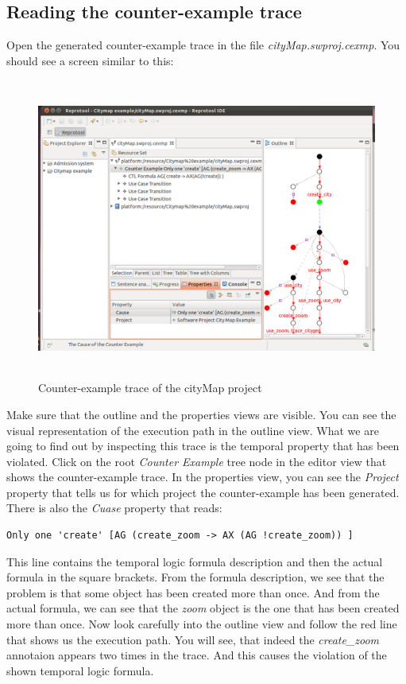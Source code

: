 \subsection{Reading the counter-example trace}
Open the generated counter-example trace in the file \emph{cityMap.swproj.cexmp}. You should see a screen similar to this:

\newpage

\begin{figure}[ht]
  \centering
  \includegraphics[height=280pt]{images/reprotoolTraceCityMap}
  \caption{Counter-example trace of the cityMap project}
  \label{fig:reprotoolTraceCityMap}
\end{figure}

Make sure that the outline and the properties views are visible. You can see the visual representation of the execution path in the
outline view. What we are going to find out by inspecting this trace is the temporal property that has been violated.
Click on the root \emph{Counter Example} tree node in the editor view that shows the counter-example trace. In the properties view,
you can see the \emph{Project} property that tells us for which project the counter-example has been generated. There is also the
\emph{Cuase} property that reads:
\begin{verbatim}
Only one 'create' [AG (create_zoom -> AX (AG !create_zoom)) ]
\end{verbatim}
This line contains the temporal logic formula description and then the actual formula in the square brackets. From the formula
description, we see that the problem is that some object has been created more than once. And from the actual formula, we can
see that the \emph{zoom} object is the one that has been created more than once. Now look carefully into the outline view and
follow the red line that shows us the execution path. You will see, that indeed the \emph{create\_zoom} annotaion appears two times
in the trace. And this causes the violation of the shown temporal logic formula.